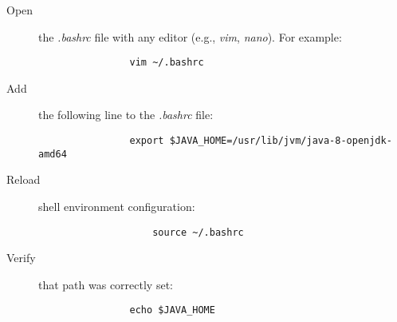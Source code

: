 \documentclass{article}
\begin{document}
            \begin{description}

                \item[Open] the \emph{.bashrc} file with any editor (e.g., \emph{vim}, \emph{nano}).
                For example:
                \begin{verbatim}
                vim ~/.bashrc
                \end{verbatim}

                \item[Add] the following line to the \emph{.bashrc} file:
                \begin{verbatim}
                export $JAVA_HOME=/usr/lib/jvm/java-8-openjdk-amd64                 
                \end{verbatim}
                
                \item[Reload] shell environment configuration:
                \begin{verbatim}
                    source ~/.bashrc
                \end{verbatim}

                \item[Verify] that path was correctly set:
                \begin{verbatim}
                echo $JAVA_HOME
                \end{verbatim}
            \end{description}
\end{document}
